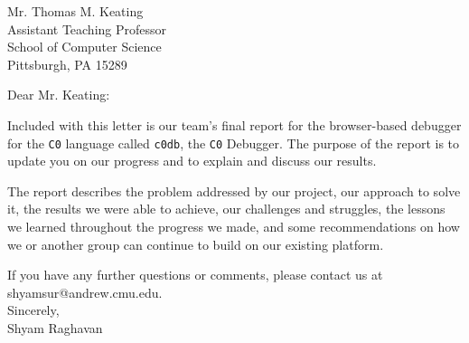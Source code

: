 \documentclass[11pt,stdletter,sigleft]{letter}
\begin{document}
\begin{letter}{Mr. Thomas M. Keating \\
    Assistant Teaching Professor \\
    School of Computer Science \\
    Pittsburgh, PA 15289}

\opening{Dear Mr. Keating:}
\vspace{5mm}

Included with this letter is our team's final report for the browser-based
debugger for the {\tt C0} language called {\tt c0db}, the {\tt C0} Debugger.
The purpose of the report is to update you on our progress and to explain and
discuss our results.

The report describes the problem addressed by our project, our approach to
solve it, the results we were able to achieve, our challenges and struggles,
the lessons we learned throughout the progress we made, and some
recommendations on how we or another group can continue to build on our
existing platform.

If you have any further questions or comments, please contact us at
shyamsur@andrew.cmu.edu.\\

Sincerely,\\[4em]
Shyam Raghavan


\end{letter}
\end{document}
